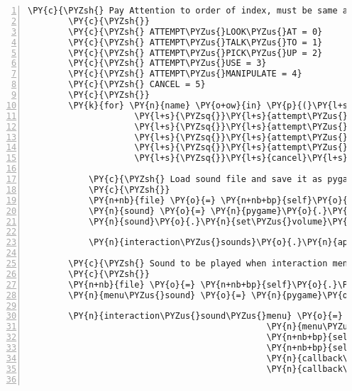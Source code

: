 \begin{Verbatim}[commandchars=\\\{\},numbers=left,firstnumber=1,stepnumber=1]
        \PY{c}{\PYZsh{} Pay Attention to order of index, must be same as in}
        \PY{c}{\PYZsh{}}
        \PY{c}{\PYZsh{} ATTEMPT\PYZus{}LOOK\PYZus{}AT = 0}
        \PY{c}{\PYZsh{} ATTEMPT\PYZus{}TALK\PYZus{}TO = 1}
        \PY{c}{\PYZsh{} ATTEMPT\PYZus{}PICK\PYZus{}UP = 2}
        \PY{c}{\PYZsh{} ATTEMPT\PYZus{}USE = 3}
        \PY{c}{\PYZsh{} ATTEMPT\PYZus{}MANIPULATE = 4}
        \PY{c}{\PYZsh{} CANCEL = 5}
        \PY{c}{\PYZsh{}}
        \PY{k}{for} \PY{n}{name} \PY{o+ow}{in} \PY{p}{(}\PY{l+s}{\PYZsq{}}\PY{l+s}{attempt\PYZus{}look\PYZus{}at}\PY{l+s}{\PYZsq{}}\PY{p}{,}
                     \PY{l+s}{\PYZsq{}}\PY{l+s}{attempt\PYZus{}talk\PYZus{}to}\PY{l+s}{\PYZsq{}}\PY{p}{,}
                     \PY{l+s}{\PYZsq{}}\PY{l+s}{attempt\PYZus{}pick\PYZus{}up}\PY{l+s}{\PYZsq{}}\PY{p}{,}
                     \PY{l+s}{\PYZsq{}}\PY{l+s}{attempt\PYZus{}use}\PY{l+s}{\PYZsq{}}\PY{p}{,}
                     \PY{l+s}{\PYZsq{}}\PY{l+s}{attempt\PYZus{}manipulate}\PY{l+s}{\PYZsq{}}\PY{p}{,}
                     \PY{l+s}{\PYZsq{}}\PY{l+s}{cancel}\PY{l+s}{\PYZsq{}}\PY{p}{)}\PY{p}{:}

            \PY{c}{\PYZsh{} Load sound file and save it as pygame.mixer.Sound:}
            \PY{c}{\PYZsh{}}
            \PY{n+nb}{file} \PY{o}{=} \PY{n+nb+bp}{self}\PY{o}{.}\PY{n}{assets}\PY{o}{.}\PY{n}{fetch}\PY{p}{(}\PY{n}{name} \PY{o}{+} \PY{l+s}{\PYZsq{}}\PY{l+s}{.ogg}\PY{l+s}{\PYZsq{}}\PY{p}{)}
            \PY{n}{sound} \PY{o}{=} \PY{n}{pygame}\PY{o}{.}\PY{n}{mixer}\PY{o}{.}\PY{n}{Sound}\PY{p}{(}\PY{n+nb}{file}\PY{p}{)}
            \PY{n}{sound}\PY{o}{.}\PY{n}{set\PYZus{}volume}\PY{p}{(}\PY{l+m+mi}{1}\PY{p}{)}

            \PY{n}{interaction\PYZus{}sounds}\PY{o}{.}\PY{n}{append}\PY{p}{(}\PY{n}{sound}\PY{p}{)}

        \PY{c}{\PYZsh{} Sound to be played when interaction menu is opened}
        \PY{c}{\PYZsh{}}
        \PY{n+nb}{file} \PY{o}{=} \PY{n+nb+bp}{self}\PY{o}{.}\PY{n}{assets}\PY{o}{.}\PY{n}{fetch}\PY{p}{(}\PY{l+s}{\PYZsq{}}\PY{l+s}{interaction\PYZus{}menu.ogg}\PY{l+s}{\PYZsq{}}\PY{p}{)}
        \PY{n}{menu\PYZus{}sound} \PY{o}{=} \PY{n}{pygame}\PY{o}{.}\PY{n}{mixer}\PY{o}{.}\PY{n}{Sound}\PY{p}{(}\PY{n+nb}{file}\PY{p}{)}

        \PY{n}{interaction\PYZus{}sound\PYZus{}menu} \PY{o}{=} \PY{n}{SoundMenuList}\PY{p}{(}\PY{n}{interaction\PYZus{}sounds}\PY{p}{,}
                                               \PY{n}{menu\PYZus{}sound}\PY{p}{,}
                                               \PY{n+nb+bp}{self}\PY{o}{.}\PY{n}{attempt\PYZus{}failed\PYZus{}sound}\PY{p}{,}
                                               \PY{n+nb+bp}{self}\PY{o}{.}\PY{n}{channel\PYZus{}system}\PY{p}{,}
                                               \PY{n}{callback\PYZus{}on\PYZus{}interaction\PYZus{}selected}\PY{p}{,}
                                               \PY{n}{callback\PYZus{}on\PYZus{}interaction\PYZus{}menu\PYZus{}exit}\PY{p}{)}


\end{Verbatim}
